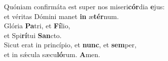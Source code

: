 \evenverse Quóniam confirmáta est super nos miseri\textbf{cór}dia \textbf{e}jus:~\*\\
\evenverse et véritas Dómini manet \textbf{in} æ\textbf{tér}num.\\
\oddverse Glória \textbf{Pa}tri, et \textbf{Fí}lio,~\*\\
\oddverse et Spi\textbf{rí}tui \textbf{San}cto.\\
\evenverse Sicut erat in princípio, et \textbf{nunc}, et \textbf{sem}per,~\*\\
\evenverse et in sǽcula sæcu\textbf{ló}rum. \textbf{A}men.\\
